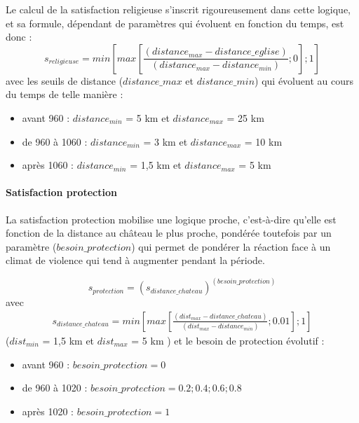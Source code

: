 Le calcul de la satisfaction religieuse s'inscrit rigoureusement dans cette logique, et sa formule, dépendant de paramètres qui évoluent en fonction du temps, est donc :
		\begin{equation*}
		s_{religieuse} = min  \left \lbrack max \left \lbrack \frac{(distance_{max} - distance\_eglise)}{(distance_{max} -distance_{min})}; 0 \right \rbrack ; 1 \right \rbrack
		\end{equation*}
avec les seuils de distance ($distance\_max$ et $distance\_min$) qui évoluent au cours du temps de telle manière :
\begin{itemize}
	\item avant 960 : $distance_{min}$ = 5 km et $distance_{max}$ =  25 km
	\item de 960 à 1060 : $distance_{min}$ = 3 km et $distance_{max}$ =  10 km
	\item après 1060 : $distance_{min}$ = 1,5 km et $distance_{max}$ =  5 km
\end{itemize}
	
\paragraph{Satisfaction protection}	

La satisfaction protection mobilise une logique proche, c'est-à-dire qu'elle est fonction de la distance au château le plus proche, pondérée toutefois par un paramètre ($besoin\_protection$) qui permet de pondérer la réaction face à un climat de violence qui tend à augmenter pendant la période.

\begin{equation*}
s_{protection} = (s_{distance\_chateau})^{(besoin\_protection)}
\end{equation*}
avec
\begin{equation*}
\begin{gathered}
s_{distance\_chateau} = min  \left \lbrack
max \left \lbrack \frac{(dist_{max} - distance\_chateau)}{(dist_{max} -distance_{min})}; 0.01 \right \rbrack ; 1 \right \rbrack
\end{gathered}
\end{equation*}
($dist_{min}$ = 1,5 km et $dist_{max}$ = 5 km )
et le besoin de protection évolutif :
\begin{itemize}
	\item avant 960 : $besoin\_protection = 0 $
	\item de 960 à 1020 : $besoin\_protection = 0.2 ; 0.4 ; 0.6 ; 0.8$
	\item après 1020 : $besoin\_protection = 1$
\end{itemize}

